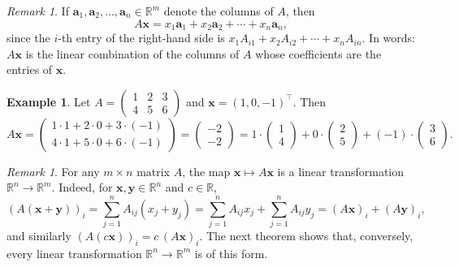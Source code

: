 \documentclass[11pt]{article}
\theoremstyle{definition}
\newtheorem{example}[definition]{Example}
\theoremstyle{plain}
\theoremstyle{remark}
\newtheorem{remark}[definition]{Remark}
\begin{document}
\begin{remark}\label{rem:columns}
    If $\mathbf{a}_1, \mathbf{a}_2, \ldots, \mathbf{a}_n \in \mathbb{R}^m$ denote the columns of $A$, then
    \[A\mathbf{x} = x_1 \mathbf{a}_1 + x_2 \mathbf{a}_2 + \cdots + x_n \mathbf{a}_n,\]
    since the $i$-th entry of the right-hand side is $x_1 A_{i1} + x_2 A_{i2} + \cdots + x_n A_{in}$. In words: $A\mathbf{x}$ is the linear combination of the columns of $A$ whose coefficients are the entries of $\mathbf{x}$.
\end{remark}

\begin{example}\label{ex:matvec}
    Let $A = \begin{pmatrix} 1 & 2 & 3 \\ 4 & 5 & 6 \end{pmatrix}$ and $\mathbf{x} = (1, 0, -1)^\top$. Then
    \[A\mathbf{x} = \begin{pmatrix}
        1 \cdot 1 + 2 \cdot 0 + 3 \cdot (-1) \\
        4 \cdot 1 + 5 \cdot 0 + 6 \cdot (-1)
    \end{pmatrix} = \begin{pmatrix}
        -2 \\
        -2
    \end{pmatrix} = 1 \cdot \begin{pmatrix} 1 \\ 4 \end{pmatrix} + 0 \cdot \begin{pmatrix} 2 \\ 5 \end{pmatrix} + (-1) \cdot \begin{pmatrix} 3 \\ 6 \end{pmatrix}.\]
\end{example}

\begin{remark}
    For any $m \times n$ matrix $A$, the map $\mathbf{x} \mapsto A\mathbf{x}$ is a linear transformation $\mathbb{R}^n \to \mathbb{R}^m$. Indeed, for $\mathbf{x}, \mathbf{y} \in \mathbb{R}^n$ and $c \in \mathbb{R}$,
    \[(A(\mathbf{x} + \mathbf{y}))_i = \sum_{j=1}^n A_{ij}(x_j + y_j) = \sum_{j=1}^n A_{ij} x_j + \sum_{j=1}^n A_{ij} y_j = (A\mathbf{x})_i + (A\mathbf{y})_i,\]
    and similarly $(A(c\mathbf{x}))_i = c\,(A\mathbf{x})_i$. The next theorem shows that, conversely, every linear transformation $\mathbb{R}^n \to \mathbb{R}^m$ is of this form.
\end{remark}
\end{document}
